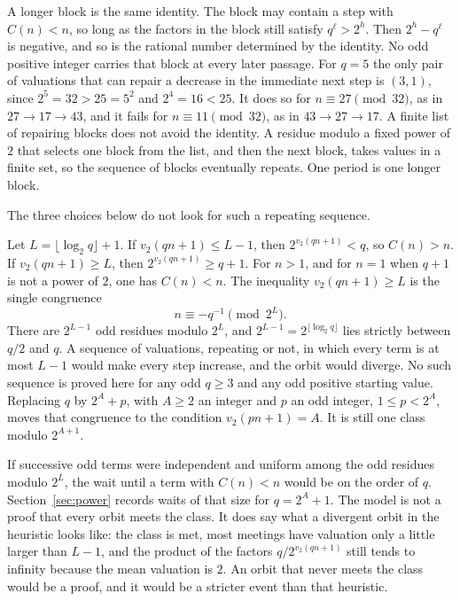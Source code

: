 \documentclass[11pt]{article}
\begin{document}
A longer block is the same identity.
The block may contain a step with \(C(n) < n\), so long as the factors in the block still satisfy \(q^\ell > 2^h\).
Then \(2^h - q^\ell\) is negative, and so is the rational number determined by the identity.
No odd positive integer carries that block at every later passage.
For \(q = 5\) the only pair of valuations that can repair a decrease in the immediate next step is \((3,1)\), since \(2^5 = 32 > 25 = 5^2\) and \(2^4 = 16 < 25\).
It does so for \(n \equiv 27 \pmod{32}\), as in \(27 \to 17 \to 43\), and it fails for \(n \equiv 11 \pmod{32}\), as in \(43 \to 27 \to 17\).
A finite list of repairing blocks does not avoid the identity.
A residue modulo a fixed power of \(2\) that selects one block from the list, and then the next block, takes values in a finite set, so the sequence of blocks eventually repeats.
One period is one longer block.

The three choices below do not look for such a repeating sequence.

Let \(L = \lfloor \log_2 q \rfloor + 1\).
If \(v_2(qn+1) \le L - 1\), then \(2^{v_2(qn+1)} < q\), so \(C(n) > n\).
If \(v_2(qn+1) \ge L\), then \(2^{v_2(qn+1)} \ge q + 1\).
For \(n > 1\), and for \(n = 1\) when \(q + 1\) is not a power of \(2\), one has \(C(n) < n\).
The inequality \(v_2(qn+1) \ge L\) is the single congruence
\[
n \equiv -q^{-1} \pmod{2^L}.
\]
There are \(2^{L-1}\) odd residues modulo \(2^L\), and \(2^{L-1} = 2^{\lfloor \log_2 q \rfloor}\) lies strictly between \(q/2\) and \(q\).
A sequence of valuations, repeating or not, in which every term is at most \(L - 1\) would make every step increase, and the orbit would diverge.
No such sequence is proved here for any odd \(q \ge 3\) and any odd positive starting value.
Replacing \(q\) by \(2^A + p\), with \(A \ge 2\) an integer and \(p\) an odd integer, \(1 \le p < 2^A\), moves that congruence to the condition \(v_2(pn+1) = A\).
It is still one class modulo \(2^{A+1}\).

If successive odd terms were independent and uniform among the odd residues modulo \(2^L\), the wait until a term with \(C(n) < n\) would be on the order of \(q\).
Section~\ref{sec:power} records waits of that size for \(q = 2^A + 1\).
The model is not a proof that every orbit meets the class.
It does say what a divergent orbit in the heuristic looks like: the class is met, most meetings have valuation only a little larger than \(L - 1\), and the product of the factors \(q/2^{v_2(qn+1)}\) still tends to infinity because the mean valuation is \(2\).
An orbit that never meets the class would be a proof, and it would be a stricter event than that heuristic.
\end{document}
